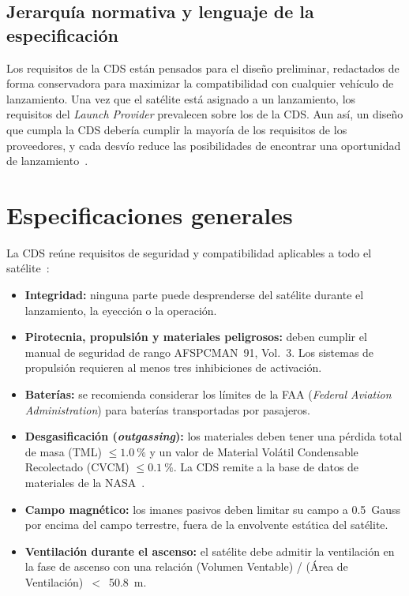 \subsection{Jerarquía normativa y lenguaje de la especificación}\label{subsec:cds-jerarquia}

Los requisitos de la CDS están pensados para el diseño preliminar, redactados de forma conservadora para maximizar la compatibilidad con cualquier vehículo de lanzamiento. Una vez que el satélite está asignado a un lanzamiento, los requisitos del \emph{Launch Provider} prevalecen sobre los de la CDS\@. Aun así, un diseño que cumpla la CDS debería cumplir la mayoría de los requisitos de los proveedores, y cada desvío reduce las posibilidades de encontrar una oportunidad de lanzamiento~\cite[Secs.~1.3 y 1.4]{cds14}.

\section{Especificaciones generales}\label{sec:cds-generales}

La CDS reúne requisitos de seguridad y compatibilidad aplicables a todo el satélite~\cite[Sec.~2.1]{cds14}:

\begin{itemize}
  \item \textbf{Integridad:} ninguna parte puede desprenderse del satélite durante el lanzamiento, la eyección o la operación.
  \item \textbf{Pirotecnia, propulsión y materiales peligrosos:} deben cumplir el manual de seguridad de rango AFSPCMAN~91, Vol.~3. Los sistemas de propulsión requieren al menos tres inhibiciones de activación.
  \item \textbf{Baterías:} se recomienda considerar los límites de la FAA (\emph{Federal Aviation Administration}) para baterías transportadas por pasajeros.
  \item \textbf{Desgasificación (\emph{outgassing}):} los materiales deben tener una pérdida total de masa (TML) $\leq \SI{1,0}{\percent}$ y un valor de Material Volátil Condensable Recolectado (CVCM) $\leq \SI{0,1}{\percent}$. La CDS remite a la base de datos de materiales de la NASA\@~\cite{nasa_outgassing}.
  \item \textbf{Campo magnético:} los imanes pasivos deben limitar su campo a \SI{0,5}{Gauss} por encima del campo terrestre, fuera de la envolvente estática del satélite.
  \item \textbf{Ventilación durante el ascenso:} el satélite debe admitir la ventilación en la fase de ascenso con una relación (Volumen Ventable) / (Área de Ventilación)~$<$~\SI{50,8}{\metre}.
\end{itemize}


